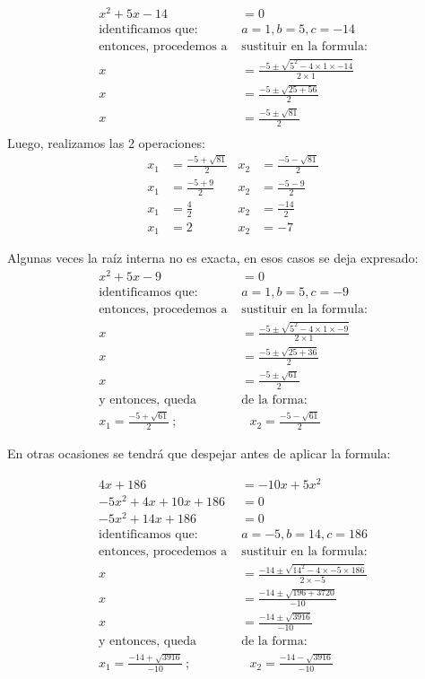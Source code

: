     \begin{align*}
        x^2 + 5x -14 &= 0		\\
        \text{identificamos que: }& a=1,b=5,c=-14\\
        \text{entonces, procedemos a }&\text{sustituir en la formula:}\\
        x &= \frac{-5\pm \sqrt{5^2-4\times1\times-14}}{2\times1}\\
        x &= \frac{-5\pm \sqrt{25+56}}{2}\\
        x &= \frac{-5\pm \sqrt{81}}{2}\\
    \end{align*}
        Luego, realizamos las 2 operaciones:
     \begin{align*}
         x_1 &= \frac{-5 +\sqrt{81}}{2} &  x_2 &= \frac{-5 -\sqrt{81}}{2}\\
         x_1 &= \frac{-5 +9}{2} & x_2 &= \frac{-5 -9}{2}\\
         x_1 &= \frac{4}{2} &  x_2 &= \frac{-14}{2}\\
         x_1 &= 2 &  x_2 &= -7
    \end{align*}

    Algunas veces la raíz interna no es exacta, en esos casos se deja expresado:
    \begin{align*}
        x^2 + 5x -9 &= 0		\\
        \text{identificamos que: }& a=1,b=5,c=-9\\
        \text{entonces, procedemos a }&\text{sustituir en la formula:}\\
        x &= \frac{-5\pm \sqrt{5^2-4\times1\times-9}}{2\times1}\\
        x &= \frac{-5\pm \sqrt{25+36}}{2}\\
        x &= \frac{-5\pm \sqrt{61}}{2}\\
        \text{y entonces, queda }&\text{de la forma:}\\
        x_1 = \frac{-5 +\sqrt{61}}{2}\ ;&\ \ \  x_2 = \frac{-5 -\sqrt{61}}{2}
    \end{align*}

    En otras ocasiones se tendrá que despejar antes de aplicar la formula:

    \begin{align*}
        4x +186 &= -10x + 5x^2 \\
        -5x^2 +4x+10x+186 &= 0\\
        -5x^2 +14x+186 &= 0\\
        \text{identificamos que: }& a=-5,b=14,c=186\\
        \text{entonces, procedemos a }&\text{sustituir en la formula:}\\
        x &= \frac{-14\pm \sqrt{14^2-4\times-5\times186}}{2\times-5}\\
        x &= \frac{-14 \pm \sqrt{196+3720}}{-10}\\
        x &= \frac{-14 \pm \sqrt{3916}}{-10} \\
        \text{y entonces, queda }&\text{de la forma:}\\
        x_1 = \frac{-14+\sqrt{3916}}{-10}\ ;&\ \ \  x_2 = \frac{-14 -\sqrt{3916}}{-10}
    \end{align*}

